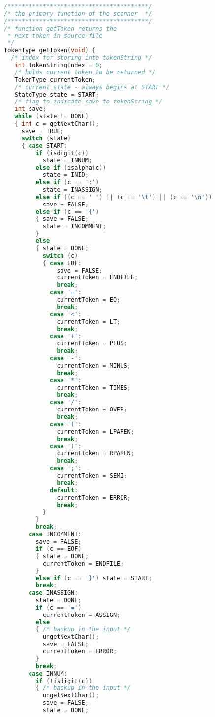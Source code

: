 \documentclass[lang=cn,10pt]{elegantbook}
\begin{document}
\begin{lstlisting}[caption={scan.c},language=c]
/****************************************/
/* the primary function of the scanner  */
/****************************************/
/* function getToken returns the 
 * next token in source file
 */
TokenType getToken(void) {
  /* index for storing into tokenString */
   int tokenStringIndex = 0;
   /* holds current token to be returned */
   TokenType currentToken;
   /* current state - always begins at START */
   StateType state = START;
   /* flag to indicate save to tokenString */
   int save;
   while (state != DONE)
   { int c = getNextChar();
     save = TRUE;
     switch (state)
     { case START:
         if (isdigit(c))
           state = INNUM;
         else if (isalpha(c))
           state = INID;
         else if (c == ':')
           state = INASSIGN;
         else if ((c == ' ') || (c == '\t') || (c == '\n'))
           save = FALSE;
         else if (c == '{')
         { save = FALSE;
           state = INCOMMENT;
         }
         else
         { state = DONE;
           switch (c)
           { case EOF:
               save = FALSE;
               currentToken = ENDFILE;
               break;
             case '=':
               currentToken = EQ;
               break;
             case '<':
               currentToken = LT;
               break;
             case '+':
               currentToken = PLUS;
               break;
             case '-':
               currentToken = MINUS;
               break;
             case '*':
               currentToken = TIMES;
               break;
             case '/':
               currentToken = OVER;
               break;
             case '(':
               currentToken = LPAREN;
               break;
             case ')':
               currentToken = RPAREN;
               break;
             case ';':
               currentToken = SEMI;
               break;
             default:
               currentToken = ERROR;
               break;
           }
         }
         break;
       case INCOMMENT:
         save = FALSE;
         if (c == EOF)
         { state = DONE;
           currentToken = ENDFILE;
         }
         else if (c == '}') state = START;
         break;
       case INASSIGN:
         state = DONE;
         if (c == '=')
           currentToken = ASSIGN;
         else
         { /* backup in the input */
           ungetNextChar();
           save = FALSE;
           currentToken = ERROR;
         }
         break;
       case INNUM:
         if (!isdigit(c))
         { /* backup in the input */
           ungetNextChar();
           save = FALSE;
           state = DONE;

\end{lstlisting}
\end{document}
